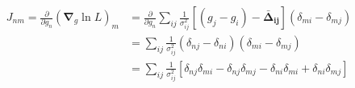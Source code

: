 \begin{align}
  J_{nm} = \frac{\partial}{\partial g_n} \left( \boldsymbol \nabla _{g}
  \ln L \right)_m &= \frac{\partial}{\partial g_n} \sum_{ij}
  \frac{1}{\sigma^2_{ij}} \left[ (g_j - g_i ) -
    \boldsymbol{\bar{\Delta}_{ij}}\right](\delta_{mi} - \delta_{mj})
  \\ 
  &= \sum_{ij} \frac{1}{\sigma^2_{ij}} ( \delta_{nj} - \delta_{ni}
  )(\delta_{mi} - \delta_{mj}) \\
  &= \sum_{ij} \frac{1}{\sigma^2_{ij}} \left[ \delta_{nj} \delta_{mi}
    - \delta_{nj}\delta_{mj} - \delta_{ni}\delta_{mi} + \delta_{ni}
    \delta_{mj} \right] \\
\end{align}
